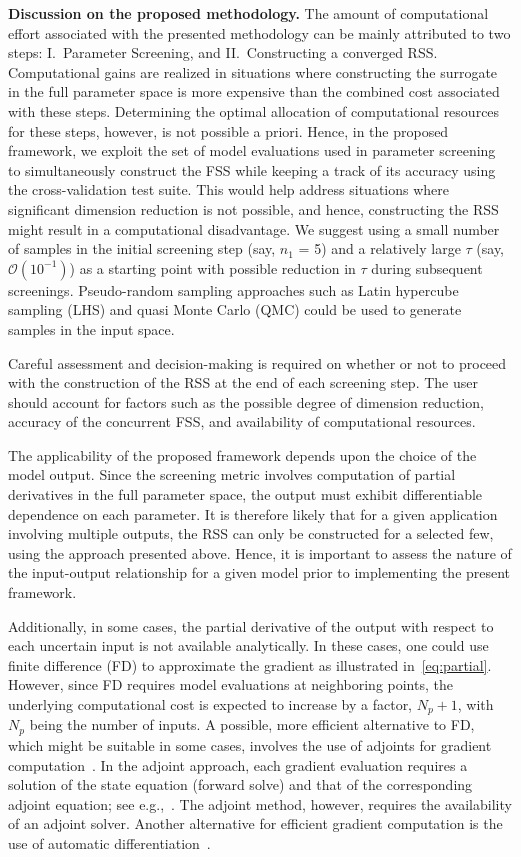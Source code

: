 \textbf{Discussion on the proposed methodology.}
The amount of computational effort associated with the presented methodology
can be mainly attributed to two steps: I.~Parameter Screening, and 
II.~Constructing a converged RSS. Computational gains are realized in situations
where constructing the surrogate in the full parameter space is more expensive
than the combined cost associated with these steps. Determining the optimal
allocation of computational resources for these steps, however, is not possible
a priori. Hence, in the proposed framework, we exploit the set of model
evaluations used in parameter screening to simultaneously construct the FSS
while keeping a track of its accuracy using the cross-validation test suite.
This would help address situations where significant dimension reduction 
is not possible, and hence, constructing the RSS might result in a 
computational
disadvantage. We suggest using a small number of samples in the initial
screening step (say, $n_1$ = 5) and a relatively large $\tau$ (say,
$\mathcal{O}(10^{-1})$) as a starting point with possible reduction in $\tau$
during subsequent screenings. Pseudo-random sampling approaches such as
Latin hypercube sampling (LHS) and quasi Monte Carlo (QMC) could be used to
generate samples in the input space.

Careful assessment and decision-making is required on whether or not to
proceed with the construction of the RSS at the end of each screening step.
The user should account for factors such as the possible degree of 
dimension reduction, accuracy of the concurrent FSS, and availability of
computational resources. 

The applicability of the proposed framework depends upon the choice of the
model output.  Since the screening metric involves computation of partial
derivatives in the full parameter space, the output must exhibit differentiable
dependence on each parameter. It is therefore likely that for a given
application involving multiple outputs, the RSS can only be constructed for a
selected few, using the approach presented above.  Hence, it is important to
assess the nature of the input-output relationship for a given model prior to
implementing the present framework. 

Additionally, in some cases, the partial
derivative of the output with respect to each uncertain input is not available
analytically. In these cases, one could use finite difference (FD) to approximate
the gradient as illustrated in~\ref{eq:partial}. However, since FD requires
model evaluations at neighboring points, the underlying computational cost is
expected to increase by a factor, $N_p+1$, with $N_p$ being the number of inputs. 
A possible, more efficient alternative to FD, which might be suitable in some cases, involves the use of adjoints for
gradient computation~\cite{Griewank:2008}. In the adjoint approach, each
gradient evaluation requires 
a solution of the state equation (forward solve) and that of the 
corresponding adjoint equation; 
see e.g.,~\cite{jameson1988aerodynamic,gunzburger2003perspectives,Borzi2011}.
The adjoint method, however, requires the availability of an adjoint solver.
Another alternative for efficient gradient computation is the use of 
automatic differentiation~\cite{Kiparissides:2009}.

